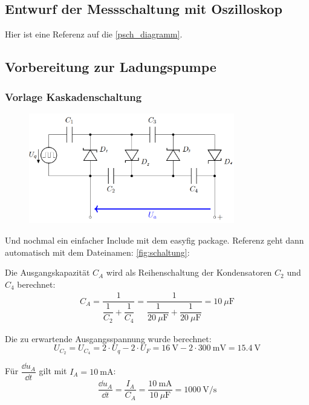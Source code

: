 \documentclass[
12pt,
a4paper,
headings=small,                    %
bibliography=totoc,                %
listof=totoc,                      %
parskip=half*,                     %
]{scrartcl}                        %
\newcommand{\laborsubsection}[2] {
    \renewcommand{\thesubsection}{#1 \thesection.\arabic{subsection}}
    \subsection{#2}
    \renewcommand{\thesubsection}{\thesection.\arabic{subsection}}
}
\begin{document}
\laborsubsection{V}{Entwurf der Messschaltung mit Oszilloskop}
Hier ist eine Referenz auf die \autoref{psch_diagramm}.
\begin{figure}[H]
    \centering
    \label{psch_diagramm}
\end{figure}

\laborsubsection{V}{Vorbereitung zur Ladungspumpe}
\subsubsection{Vorlage Kaskadenschaltung}
\begin{figure}[H]
    \centering
    \includegraphics[width=0.8\textwidth]{schaltung}
    \label{kaskadenschaltung}
\end{figure}

Und nochmal ein einfacher Include mit dem easyfig package. Referenz geht dann automatisch mit dem Dateinamen: \autoref{fig:schaltung}:

Die Ausgangskapazität $C_A$ wird als Reihenschaltung der Kondensatoren $C_2$ und $C_4$ berechnet:
\begin{align}
    C_A = \dfrac{1}{\dfrac{1}{C_2}+\dfrac{1}{C_4}} = \dfrac{1}{\dfrac{1}{\SI{20}{\mu\farad}}+\dfrac{1}{\SI{20}{\mu\farad}}} = \SI{10}{\mu\farad}
\end{align}

Die zu erwartende Ausgangsspannung wurde berechnet:
\begin{equation}
    U_{C_2} =  U_{C_4}  = 2 \cdot U_{q} - 2 \cdot U_{F} = \SI{16}{\volt} - 2 \cdot \SI{300}{\milli\volt} = \SI{15,4}{\volt}
\end{equation}

Für $\dfrac{\dd{u_A}}{\dd{t}}$ gilt mit $I_A = \SI{10}{\milli\ampere}$:
\begin{equation}
    \dfrac{\dd{u_A}}{\dd{t}} = \dfrac{I_A}{C_A} = \dfrac{\SI{10}{\milli\ampere}}{\SI{10}{\mu\farad}} = \SI{1000}{\volt\per\second}
\end{equation}
\end{document}
